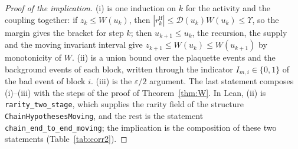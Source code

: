 \documentclass[11pt,a4paper]{article}
\theoremstyle{definition}
\theoremstyle{remark}
\newcommand{\lt}[1]{\texttt{#1}}
\begin{document}
\begin{proof}[Proof of the implication]
(i) is one induction on $k$ for the activity and the coupling together: if $z_k\le W(u_k)$, then $|r^{\mathrm{lf}}_k|\le\mathcal D(u_k)W(u_k)\le\Upsilon$, so the margin gives the bracket for step $k$; then $u_{k+1}\le u_k$, the recursion, the supply and the moving invariant interval give $z_{k+1}\le W(u_k)\le W(u_{k+1})$ by monotonicity of $W$. (ii) is a union bound over the plaquette events and the background events of each block, written through the indicator $I_{m,i}\in\{0,1\}$ of the bad event of block $i$. (iii) is the $\varepsilon/2$ argument. The last statement composes (i)--(iii) with the steps of the proof of Theorem~\ref{thm:W}. In Lean, (ii) is \lt{rarity\_\allowbreak{}two\_\allowbreak{}stage}, which supplies the rarity field of the structure \lt{ChainHypothesesMoving}, and the rest is the statement \lt{chain\_\allowbreak{}end\_\allowbreak{}to\_\allowbreak{}end\_\allowbreak{}moving}; the implication is the composition of these two statements (Table~\ref{tab:corr2}).
\end{proof}
\end{document}
